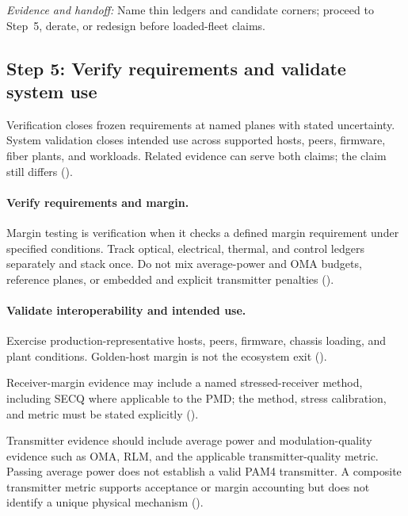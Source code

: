 \textit{Evidence and handoff:} Name thin ledgers and candidate corners; proceed
to Step~5, derate, or redesign before loaded-fleet claims.

\subsection{Step 5: Verify requirements and validate system use}
\label{sec:ladder-margin}
\label{sec:ladder-margin-interop}
\label{sec:ladder-interop}

Verification closes frozen requirements at named planes with stated uncertainty.
System validation closes intended use across supported hosts, peers, firmware,
fiber plants, and workloads. Related evidence can serve both claims; the claim
still differs ().

\paragraph{Verify requirements and margin.}
\label{sec:ladder-verify}
Margin testing is verification when it checks a defined margin requirement under
specified conditions. Track optical, electrical, thermal, and control ledgers
separately and stack once. Do not mix average-power and
OMA
budgets, reference planes, or embedded and explicit transmitter penalties
().

\paragraph{Validate interoperability and intended use.}
\label{sec:ladder-system-validation}
Exercise production-representative hosts, peers, firmware, chassis loading, and
plant conditions. Golden-host margin is not the ecosystem exit
().

Receiver-margin evidence may include a named stressed-receiver method,
including SECQ where applicable to the
PMD;
the method, stress calibration, and metric must be stated explicitly
().

Transmitter evidence should include average power and modulation-quality
evidence such as OMA,
RLM,
and the applicable transmitter-quality metric.
Passing average power does not establish a valid PAM4 transmitter. A composite
transmitter metric supports acceptance or margin accounting but does not
identify a unique physical mechanism ().

